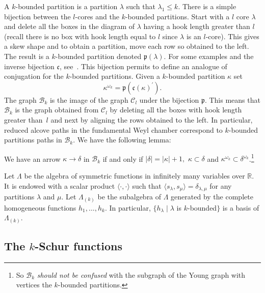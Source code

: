 \documentclass[ALCO,ThmDefs,Unicode,epreuves]{cedram}
\begin{document}

A $k$-bounded partition is a partition $\lambda$ such that $\lambda_{1}\leq
k$. There is a simple bijection between the $l$-cores and the $k$-bounded
partitions. Start with a $l$ core $\lambda$ and delete all the boxes in the
diagram of $\lambda$ having a hook length greater than $l$ (recall there is no
box with hook length equal to $l$ since $\lambda$ is an $l$-core). This gives a
skew shape and to obtain a partition, move each row so obtained to the left.
The result is a $k$-bounded partition denoted $\mathfrak{p}(\lambda)$. For
some examples and the inverse bijection $\mathfrak{c}$, see~\cite[pages~18 and~19]{LLMSSZ}. This bijection permits to define an analogue of conjugation
for the $k$-bounded partitions. Given a $k$-bounded partition $\kappa$ set%
\[
\kappa^{\omega_{k}}=\mathfrak{p}(\mathfrak{c}(\kappa)^{\prime}).
\]
The graph $\mathcal{B}_{k}$ is the image of the graph $\mathcal{C}_{l}$ under
the bijection $\mathfrak{p}$. This means that $\mathcal{B}_{k}$ is the graph
obtained from $\mathcal{C}_{l}$ by deleting all the boxes with hook length
greater than~$l$ and next by aligning the rows obtained to the left. In
particular, reduced alcove paths in the fundamental Weyl chamber correspond to
$k$-bounded partitions paths in $\mathcal{B}_{k}$. We have the following lemma:

\begin{lemma}
We have an arrow $\kappa\rightarrow\delta$ in $\mathcal{B}_{k}$ if and only if
$\left\vert \delta\right\vert =\left\vert \kappa\right\vert +1,$
$\kappa\subset\delta$ and $\kappa^{\omega_{k}}\subset\delta^{\omega_{k}}%
$.\footnote{So $\mathcal{B}_{k}$ \emph{should not be confused} with the
subgraph of the Young graph with vertices the $k$-bounded partitions.}
\end{lemma}

Let $\Lambda$ be the algebra of symmetric functions in infinitely many
variables over $\mathbb{R}$. It is endowed with a scalar product $\langle
\cdot,\cdot\rangle$ such that $\langle s_{\lambda},s_{\mu}\rangle
=\delta_{\lambda,\mu}$ for any partitions $\lambda$ and $\mu$. Let
$\Lambda_{(k)}$ be the subalgebra of $\Lambda$ generated by the complete
homogeneous functions $h_{1},\ldots,h_{k}$. In particular, $\{h_{\lambda}%
\mid\lambda$ is $k$-bounded$\}$ is a basis of $\Lambda_{(k)}$.

\subsection{The \texorpdfstring{$k$}{k}-Schur functions}
\end{document}
